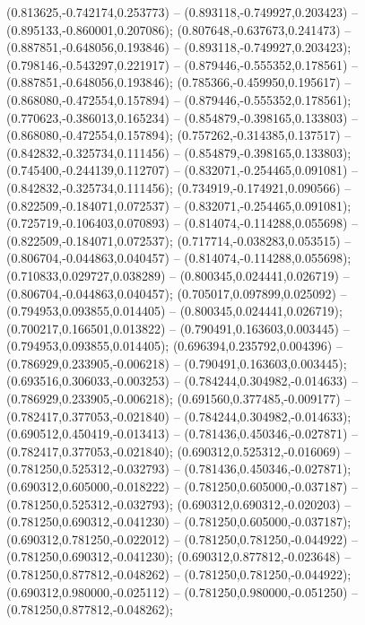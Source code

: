  (0.813625,-0.742174,0.253773) -- (0.893118,-0.749927,0.203423) -- (0.895133,-0.860001,0.207086);
 (0.807648,-0.637673,0.241473) -- (0.887851,-0.648056,0.193846) -- (0.893118,-0.749927,0.203423);
 (0.798146,-0.543297,0.221917) -- (0.879446,-0.555352,0.178561) -- (0.887851,-0.648056,0.193846);
 (0.785366,-0.459950,0.195617) -- (0.868080,-0.472554,0.157894) -- (0.879446,-0.555352,0.178561);
 (0.770623,-0.386013,0.165234) -- (0.854879,-0.398165,0.133803) -- (0.868080,-0.472554,0.157894);
 (0.757262,-0.314385,0.137517) -- (0.842832,-0.325734,0.111456) -- (0.854879,-0.398165,0.133803);
 (0.745400,-0.244139,0.112707) -- (0.832071,-0.254465,0.091081) -- (0.842832,-0.325734,0.111456);
 (0.734919,-0.174921,0.090566) -- (0.822509,-0.184071,0.072537) -- (0.832071,-0.254465,0.091081);
 (0.725719,-0.106403,0.070893) -- (0.814074,-0.114288,0.055698) -- (0.822509,-0.184071,0.072537);
 (0.717714,-0.038283,0.053515) -- (0.806704,-0.044863,0.040457) -- (0.814074,-0.114288,0.055698);
 (0.710833,0.029727,0.038289) -- (0.800345,0.024441,0.026719) -- (0.806704,-0.044863,0.040457);
 (0.705017,0.097899,0.025092) -- (0.794953,0.093855,0.014405) -- (0.800345,0.024441,0.026719);
 (0.700217,0.166501,0.013822) -- (0.790491,0.163603,0.003445) -- (0.794953,0.093855,0.014405);
 (0.696394,0.235792,0.004396) -- (0.786929,0.233905,-0.006218) -- (0.790491,0.163603,0.003445);
 (0.693516,0.306033,-0.003253) -- (0.784244,0.304982,-0.014633) -- (0.786929,0.233905,-0.006218);
 (0.691560,0.377485,-0.009177) -- (0.782417,0.377053,-0.021840) -- (0.784244,0.304982,-0.014633);
 (0.690512,0.450419,-0.013413) -- (0.781436,0.450346,-0.027871) -- (0.782417,0.377053,-0.021840);
 (0.690312,0.525312,-0.016069) -- (0.781250,0.525312,-0.032793) -- (0.781436,0.450346,-0.027871);
 (0.690312,0.605000,-0.018222) -- (0.781250,0.605000,-0.037187) -- (0.781250,0.525312,-0.032793);
 (0.690312,0.690312,-0.020203) -- (0.781250,0.690312,-0.041230) -- (0.781250,0.605000,-0.037187);
 (0.690312,0.781250,-0.022012) -- (0.781250,0.781250,-0.044922) -- (0.781250,0.690312,-0.041230);
 (0.690312,0.877812,-0.023648) -- (0.781250,0.877812,-0.048262) -- (0.781250,0.781250,-0.044922);
 (0.690312,0.980000,-0.025112) -- (0.781250,0.980000,-0.051250) -- (0.781250,0.877812,-0.048262);

